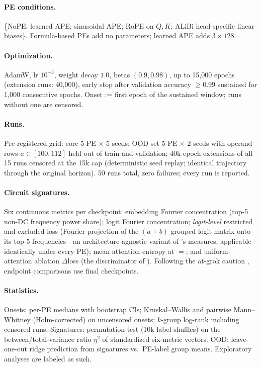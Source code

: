 \documentclass[letterpaper]{article}
\begin{document}
\paragraph{PE conditions.} \{NoPE; learned APE; sinusoidal APE; RoPE on
$Q,K$; ALiBi head-specific linear biases\}. Formula-based PEs add no
parameters; learned APE adds $3\times128$.

\paragraph{Optimization.} AdamW, lr $10^{-3}$, weight decay $1.0$, betas
$(0.9, 0.98)$, up to 15{,}000 epochs (extension runs: 40{,}000), early stop
after validation accuracy $\ge 0.99$ sustained for 1{,}000 consecutive epochs.
Onset := first epoch of the sustained window; runs without one are censored.

\paragraph{Runs.} Pre-registered grid: core 5 PE $\times$ 5 seeds; OOD set
5 PE $\times$ 2 seeds with operand rows $a \in [100,112]$ held out of train
and validation; 40k-epoch extensions of all 15 runs censored at the 15k cap
(deterministic seed replay; identical trajectory through the original
horizon). 50 runs total, zero failures; every run is reported.

\paragraph{Circuit signatures.} Six continuous metrics per checkpoint:
embedding Fourier concentration (top-5 non-DC frequency power share); logit
Fourier concentration; \emph{logit-level} restricted and excluded loss
(Fourier projection of the $(a{+}b)$-grouped logit matrix onto its top-5
frequencies---an architecture-agnostic variant of \citet{nanda2023progress}'s
measures, applicable identically under every PE); mean attention entropy at
${=}$; and uniform-attention ablation $\Delta$loss (the discriminator of
\citet{zhong2023clock}). Following the at-grok caution
\cite{truong2026atgrok}, endpoint comparisons use final checkpoints.

\paragraph{Statistics.} Onsets: per-PE medians with bootstrap CIs;
Kruskal--Wallis and pairwise Mann--Whitney (Holm-corrected) on uncensored
onsets; $k$-group log-rank including censored runs. Signatures: permutation
test (10k label shuffles) on the between/total-variance ratio $\eta^2$ of
standardized six-metric vectors. OOD: leave-one-out ridge prediction from
signatures vs.\ PE-label group means. Exploratory analyses are labeled as such.
\end{document}
